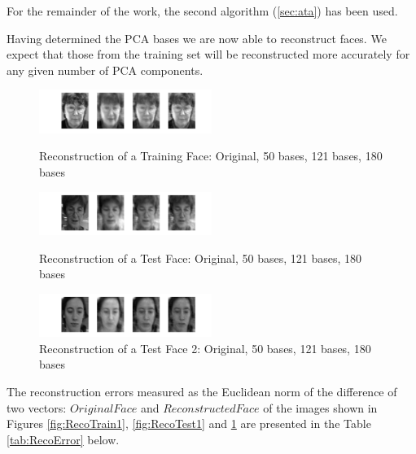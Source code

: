 \documentclass[10pt,twocolumn,letterpaper]{article}
\begin{document}
For the remainder of the work, the second algorithm (\ref{sec:ata}) has been used.

Having determined the PCA bases we are now able to reconstruct faces. We expect that those from the training set will be reconstructed more accurately for any given number of PCA components.

\begin{figure}[H]
\begin{center}
\includegraphics[width=0.5\textwidth]{../results/Train1_reco}

  \caption{Reconstruction of a Training Face: Original, 50 bases, 121 bases, 180 bases \label{fig:RecoTrain1}}
  
  \includegraphics[width=0.5\textwidth]{../results/Test1_reco}

  \caption{Reconstruction of a Test Face: Original, 50 bases, 121 bases, 180 bases \label{fig:RecoTest1}}

    \includegraphics[width=0.5\textwidth]{../results/Test2_reco}

  \caption{Reconstruction of a Test Face 2: Original, 50 bases, 121 bases, 180 bases \label{fig:RecoTest2}}

\end{center}
\end{figure}

The reconstruction errors measured as the Euclidean norm of the difference of two vectors: $Original Face$ and $Reconstructed Face$ of the images shown in Figures \ref{fig:RecoTrain1},  \ref{fig:RecoTest1} and \ref{fig:RecoTest2} are presented in the Table \ref{tab:RecoError} below.
\end{document}
